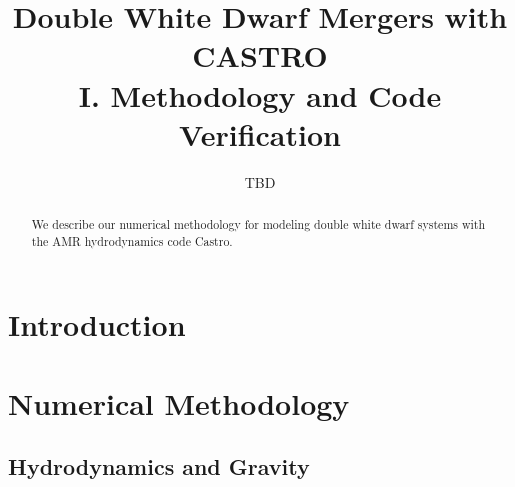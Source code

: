 \documentclass[12pt,preprint]{aastex}
\begin{document}
\title{Double White Dwarf Mergers with CASTRO\\ I. Methodology and Code 
       Verification}


\author{TBD}
\begin{abstract}
We describe our numerical methodology for modeling double white dwarf
systems with the AMR hydrodynamics code Castro.

\end{abstract}

\section{Introduction}



\section{Numerical Methodology}\label{sec:Numerical Methodology}

\subsection{Hydrodynamics and Gravity}
\end{document}
